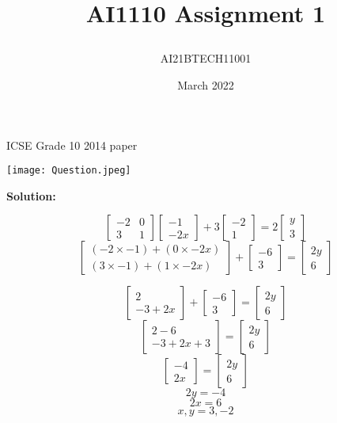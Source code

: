 \documentclass[journal,12pt,twocolumn]{IEEEtran}
\title{\textbf{AI1110 Assignment 1}
\author{AI21BTECH11001 }}
\date{March 2022}
\begin{document}
\maketitle
\begin{center}
{ICSE Grade 10 2014 paper}\end{center}

\texttt{[image: Question.jpeg]}

\textbf{Solution:}

$$ 
\left [\begin{array}{cc} -2 & 0 \\
 3 & 1\end{array}\right ]\left[\begin{array}{cc}-1 \\
 -2x\end{array}\right]+3\left[\begin{array}{cc}-2 \\
 1\end{array}\right] = 2\left[\begin{array}{cc}y \\
 3\end{array}\right]
$$
$$
\left[\begin{array}{cc}(-2\times-1) + (0\times-2x) \\
 (3\times-1) + (1\times-2x)\end{array}\right] + \left[\begin{array}{cc}-6 \\
 3\end{array}\right] = \left[\begin{array}{cc}2y \\
 6\end{array}\right]
$$

$$
\left[\begin{array}{cc}2 \\
 -3+2x\end{array}\right]+\left[\begin{array}{cc}-6 \\
 3\end{array}\right] = \left[\begin{array}{cc}2y \\
 6\end{array}\right]
$$
$$
\left[\begin{array}{cc}2-6 \\
 -3+2x+3\end{array}\right] = \left[\begin{array}{cc}2y \\
 6\end{array}\right]
$$
$$
\left[\begin{array}{cc}-4 \\
 2x\end{array}\right] = \left[\begin{array}{cc}2y \\
 6\end{array}\right]
$$
$$2y = -4$$
$$2x = 6 $$
$$x,y = 3,-2 $$
\end{document}
